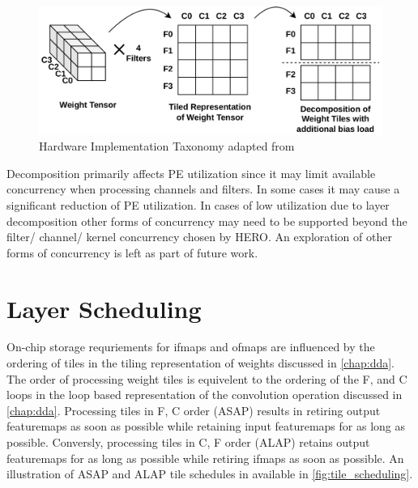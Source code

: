 \begin{figure}[ht]
    \centering
    \includegraphics[scale=0.4]{fig/ofmap_decomposition_tiling_repr.pdf}
    \caption{Hardware Implementation Taxonomy adapted from \cite{maestro}}
    \label{fig:ofmap_decomposition:weight_tiling}
\end{figure}

Decomposition primarily affects PE utilization since it may limit available
concurrency when processing channels and filters. In some cases it may cause a
significant reduction of PE utilization. In cases of low utilization due to
layer decomposition other forms of concurrency may need to be supported beyond
the filter/ channel/ kernel concurrency chosen by HERO. An exploration of other
forms of concurrency is left as part of future work. 

\section{Layer Scheduling}
\label{chap:net_compile:layer_scheduling}

On-chip storage requriements for ifmaps and ofmaps are influenced by the
ordering of tiles in the tiling representation of weights discussed in
\autoref{chap:dda}. The order of processing weight tiles is equivelent to the
ordering of the F, and C loops in the loop based representation of the
convolution operation discussed in \autoref{chap:dda}. Processing tiles in F, C
order (ASAP) results in retiring output featuremaps as soon as possible while retaining
input featuremaps for as long as possible. Conversly, processing tiles in C, F
order (ALAP) retains output featuremaps for as long as possible while retiring ifmaps
as soon as possible. An illustration of ASAP and ALAP tile schedules in
available in \autoref{fig:tile_scheduling}. 

